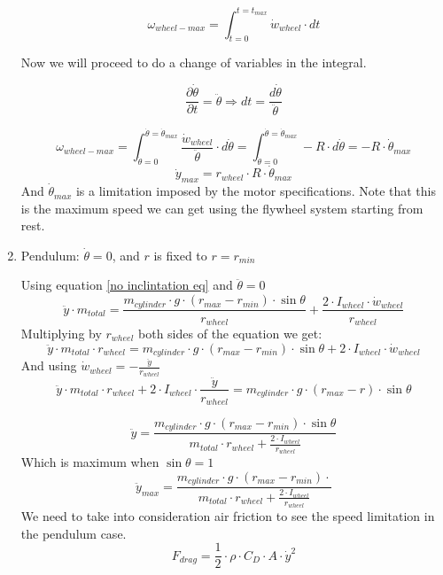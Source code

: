 \begin{enumerate}
    \[\omega_{wheel-max} = \int_{t=0}^{t=t_{max}} \dot{w}_{wheel} \cdot  dt\]

    Now we will proceed to do a change of variables in the integral.

    \[
    \frac{\partial \dot{\theta}}{\partial t} = \ddot{\theta} \Rightarrow dt = \frac{d\dot{\theta}}{\ddot{\theta}}
    \]
    
    \[\omega_{wheel-max} = \int_{\dot{\theta}=0}^{\dot{\theta}=\dot{\theta}_{max}} \frac{\dot{w}_{wheel}}{\ddot{\theta}} \cdot  d\dot{\theta} = 
    \int_{\dot{\theta}=0}^{\dot{\theta}=\dot{\theta}_{max}} -R \cdot  d\dot{\theta} = - R \cdot  \dot{\theta}_{max}
    \]
    \begin{equation}
        \boxed{\dot{y}_{max} = r_{wheel} \cdot  R \cdot  \dot{\theta}_{max}}
        \label{Maximum speed flywheel}
    \end{equation}
    And $\dot{\theta}_{max}$ is a limitation imposed by the motor specifications. Note that this is the maximum speed
    we can get using the flywheel system starting from rest.


    \item Pendulum: $\dot{\theta} = 0$, and $r$ is fixed to $r = r_{min}$
    
    Using equation \ref{no inclintation eq} and $\ddot{\theta} = 0$
    \[\ddot{y}\cdot m_{total} = \frac{m_{cylinder} \cdot  g \cdot  (r_{max} - r_{min}) \cdot  \sin{\theta}}{r_{wheel}} +\frac{2\cdot I_{wheel} \cdot  \dot{w}_{wheel}}{r_{wheel}}\]
    Multiplying by $r_{wheel}$ both sides of the equation we get:
    \[\ddot{y}\cdot m_{total} \cdot  r_{wheel} = m_{cylinder} \cdot  g \cdot  (r_{max}-r_{min}) \cdot  \sin{\theta} + 2\cdot I_{wheel} \cdot  \dot{w}_{wheel}\]
    And using $\dot{w}_{wheel} = -\frac{\ddot{y}}{r_{wheel}}$
    \[\ddot{y}\cdot m_{total} \cdot  r_{wheel} + 2\cdot  I_{wheel} \cdot  \frac{\ddot{y}}{r_{wheel}} = m_{cylinder} \cdot  g \cdot  (r_{max}-r) \cdot  \sin{\theta} \]

    \[\ddot{y}  = \frac{m_{cylinder} \cdot  g \cdot  (r_{max}-r_{min}) \cdot  \sin{\theta}}{m_{total} \cdot  r_{wheel} + \frac{2\cdot I_{wheel}}{r_{wheel}} }  \]
    Which is maximum when $\sin{\theta}=1$
    \begin{equation}
        \boxed{ \ddot{y}_{max}  = \frac{m_{cylinder} \cdot  g \cdot  (r_{max}-r_{min}) \cdot}{m_{total} \cdot  r_{wheel} + \frac{2\cdot I_{wheel}}{r_{wheel}} } }
        \label{maximum acceleration pendulum}
    \end{equation}
    We need to take into consideration air friction to see the speed limitation in the pendulum case.
    \[F_{drag} = \frac{1}{2}\cdot \rho\cdot C_D \cdot  A \cdot  \dot{y}^2 \]


\end{enumerate}
